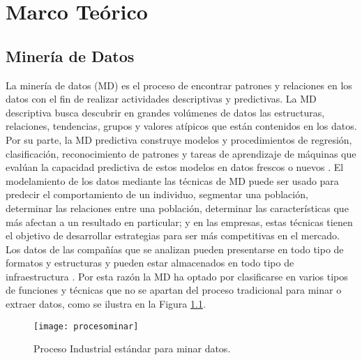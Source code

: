 \chapter{Marco Teórico}

\section{Minería de Datos}

La minería de datos (MD) es el proceso de encontrar patrones y relaciones en los datos con el fin de realizar actividades descriptivas y predictivas. La MD descriptiva busca descubrir en grandes volúmenes de datos las estructuras, relaciones, tendencias, grupos y valores atípicos que están contenidos en los datos. Por su parte, la MD predictiva construye modelos y procedimientos de regresión, clasificación, reconocimiento de patrones y tareas de aprendizaje de máquinas  que evalúan la capacidad predictiva de estos modelos en datos frescos o nuevos \cite{Izenman2006}. 
El modelamiento de los datos mediante las técnicas de MD puede ser usado para predecir el comportamiento de un individuo, segmentar una población, determinar las relaciones entre una población, determinar las características que más afectan a un resultado en particular; y en las empresas, estas técnicas tienen el objetivo de desarrollar estrategias para ser más competitivas en el mercado. Los datos de las compañías que se analizan pueden presentarse en todo tipo de formatos y estructuras y pueden estar almacenados en todo tipo de infraestructura \cite{Izenman2006}. Por esta razón la MD ha optado por clasificarse en varios tipos de funciones y técnicas que no se apartan del proceso tradicional para minar o extraer datos, como se ilustra en la Figura \ref{procesominar}.

\begin{figure}[h]
	\centering
	\texttt{[image: procesominar]}
	\caption{Proceso Industrial estándar para minar datos.}
	\label{procesominar}
\end{figure}



